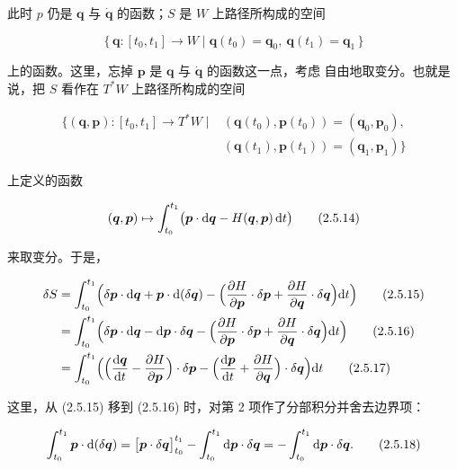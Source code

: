 此时 $p$ 仍是 $\bm{q}$ 与 $\dot{\bm{q}}$ 的函数；$S$ 是 $W$ 上路径所构成的空间

\begin{equation}
  \{\,\bm{q}:[t_0,t_1]\to W \mid \bm{q}(t_0)=\bm{q}_0,\
  \bm{q}(t_1)=\bm{q}_1\,\}
  \tag{2.5.13}
\end{equation}

上的函数。这里，忘掉 $\bm{p}$ 是 $\bm{q}$ 与 $\dot{\bm{q}}$ 的函数这一点，考虑
自由地取变分。也就是说，把 $S$ 看作在 $T^*W$ 上路径所构成的空间

\[
\begin{aligned}
  \bigl\{(\bm{q},\bm{p}):[t_0,t_1]\to T^*W \mid
  &(\bm{q}(t_0),\bm{p}(t_0)) = (\bm{q}_0,\bm{p}_0),\\
  &(\bm{q}(t_1),\bm{p}(t_1)) = (\bm{q}_1,\bm{p}_1)\bigr\}
\end{aligned}
\]

上定义的函数

\begin{equation}
  (\bm{q},\bm{p})\mapsto \int_{t_0}^{t_1}
  \bigl(\bm{p}\cdot\mathrm{d}\bm{q} - H(\bm{q},\bm{p})\,\mathrm{d} t\bigr)
  \tag{2.5.14}
\end{equation}

来取变分。于是，

\begin{align}
  \delta S &= \int_{t_0}^{t_1}
    \Bigl(\delta\bm{p}\cdot\mathrm{d}\bm{q} + \bm{p}\cdot\mathrm{d}(\delta\bm{q})
      - \Bigl(\frac{\partial H}{\partial\bm{p}}\cdot\delta\bm{p}
        + \frac{\partial H}{\partial\bm{q}}\cdot\delta\bm{q}\Bigr)\mathrm{d} t
    \Bigr) \tag{2.5.15}\\
  &= \int_{t_0}^{t_1}
    \Bigl(\delta\bm{p}\cdot\mathrm{d}\bm{q} - \mathrm{d}\bm{p}\cdot\delta\bm{q}
      - \Bigl(\frac{\partial H}{\partial\bm{p}}\cdot\delta\bm{p}
        + \frac{\partial H}{\partial\bm{q}}\cdot\delta\bm{q}\Bigr)\mathrm{d} t
    \Bigr) \tag{2.5.16}\\
  &= \int_{t_0}^{t_1}
    \Bigl(\Bigl(\frac{\mathrm{d}\bm{q}}{\mathrm{d} t}
        - \frac{\partial H}{\partial\bm{p}}\Bigr)\cdot\delta\bm{p}
      - \Bigl(\frac{\mathrm{d}\bm{p}}{\mathrm{d} t}
        + \frac{\partial H}{\partial\bm{q}}\Bigr)\cdot\delta\bm{q}
    \Bigr)\mathrm{d} t \tag{2.5.17}
\end{align}

这里，从 (2.5.15) 移到 (2.5.16) 时，对第 2 项作了分部积分并舍去边界项：

\begin{equation}
  \int_{t_0}^{t_1}\bm{p}\cdot\mathrm{d}(\delta\bm{q})
  = \bigl[\bm{p}\cdot\delta\bm{q}\bigr]_{t_0}^{t_1}
    - \int_{t_0}^{t_1}\mathrm{d}\bm{p}\cdot\delta\bm{q}
  = -\int_{t_0}^{t_1}\mathrm{d}\bm{p}\cdot\delta\bm{q}.
  \tag{2.5.18}
\end{equation}

